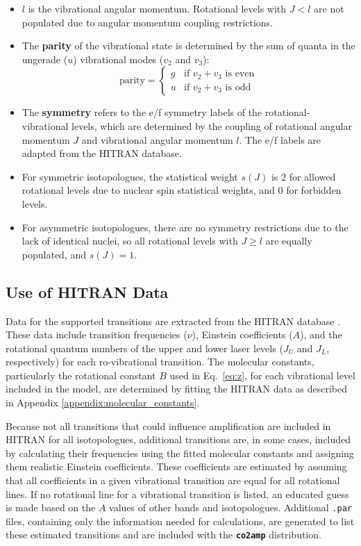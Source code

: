 \begin{itemize}
    \item \(l\) is the vibrational angular momentum. Rotational levels with \( J < l \) are not populated due to angular momentum coupling restrictions.
    \item The \textbf{parity} of the vibrational state is determined by the sum of quanta in the ungerade (\( u \)) vibrational modes (\( v_2 \) and \( v_3 \)):
    \[
    \text{parity} = \begin{cases}
    g & \text{if } v_2 + v_3 \text{ is even} \\
    u & \text{if } v_2 + v_3 \text{ is odd}
    \end{cases}
    \]
    \item The \textbf{symmetry} refers to the e/f symmetry labels of the rotational-vibrational levels, which are determined by the coupling of rotational angular momentum \( J \) and vibrational angular momentum \( l \). The e/f labels are adapted from the HITRAN database.
    \item For symmetric isotopologues, the statistical weight \( s(J) \) is 2 for allowed rotational levels due to nuclear spin statistical weights, and 0 for forbidden levels.
    \item For asymmetric isotopologues, there are no symmetry restrictions due to the lack of identical nuclei, so all rotational levels with \( J \geq l \) are equally populated, and \( s(J) = 1 \).
\end{itemize}



\subsection{Use of HITRAN Data}

Data for the supported transitions are extracted from the HITRAN database \cite{Gordon-2022}. These data include transition frequencies ($\nu$), Einstein coefficients ($A$), and the rotational quantum numbers of the upper and lower laser levels ($J_U$ and $J_L$, respectively) for each ro-vibrational transition. The molecular constants, particularly the rotational constant $B$ used in Eq.~\ref{eq:z}, for each vibrational level included in the model, are determined by fitting the HITRAN data as described in Appendix \ref{appendix:molecular_constants}.

Because not all transitions that could influence amplification are included in HITRAN for all isotopologues, additional transitions are, in some cases, included by calculating their frequencies using the fitted molecular constants and assigning them realistic Einstein coefficients. These coefficients are estimated by assuming that all coefficients in a given vibrational transition are equal for all rotational lines. If no rotational line for a vibrational transition is listed, an educated guess is made based on the $A$ values of other bands and isotopologues. Additional \texttt{.par} files, containing only the information needed for calculations, are generated to list these estimated transitions and are included with the \textbf{\texttt{co2amp}} distribution.

